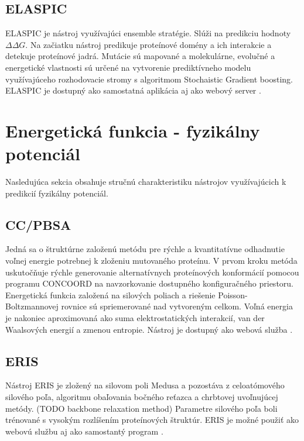 \subsection{ELASPIC}

ELASPIC je nástroj využívajúci ensemble stratégie. Slúži na predikciu hodnoty $\Delta\Delta G$. Na začiatku nástroj predikuje proteínové domény a ich interakcie a detekuje proteínové jadrá. Mutácie sú mapované a molekulárne, evolučné a energetické vlastnosti sú určené na vytvorenie prediktívneho modelu využívajúceho rozhodovacie stromy s algoritmom Stochaistic Gradient boosting. ELASPIC je dostupný ako samostatná aplikácia aj ako webový server \cite{elaspic}.

\section{Energetická funkcia - fyzikálny potenciál}

Nasledujúca sekcia obsahuje stručnú charakteristiku nástrojov využívajúcich k predikcií fyzikálny potenciál.

\subsection{CC/PBSA}

Jedná sa o štruktúrne založenú metódu pre rýchle a kvantitatívne odhadnutie voľnej energie potrebnej k zloženiu mutovaného proteínu. V prvom kroku metóda uskutočňuje rýchle generovanie alternatívnych proteínových konformácií pomocou programu CONCOORD na navzorkovanie dostupného konfiguračného priestoru. Energetická funkcia založená na silových poliach a riešenie Poisson-Boltzmannovej rovnice sú spriemerované nad vytvoreným celkom. Voľná energia je nakoniec aproximovaná ako suma elektrostatických interakcií, van der Waalsových energií a zmenou entropie. Nástroj je dostupný ako webová služba \cite{ccpbsa}. 

\subsection{ERIS}

Nástroj ERIS je zložený na silovom poli Medusa a pozostáva z celoatómového silového poľa, algoritmu obaľovania bočného reťazca a chrbtovej uvoľnujúcej metódy. (TODO backbone relaxation method) Parametre silového poľa boli trénované s vysokým rozlíšením proteínových štruktúr. ERIS je možné použiť ako webovú službu aj ako samostantý program \cite{eris}.

